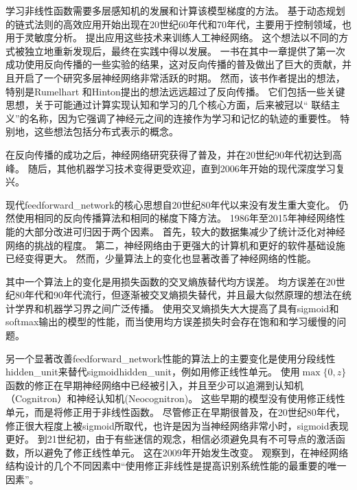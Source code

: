 学习非线性函数需要多层感知机的发展和计算该模型梯度的方法。
基于动态规划的链式法则的高效应用开始出现在20世纪60年代和70年代，主要用于控制领域\citep{Kelley-1960,Bryson-et-al-1961,Dreyfus-1962,Bryson-1969,Dreyfus-1973}，也用于灵敏度分析\citep{Linnainmaa-1976}。 
\cite{Werbos-1981}提出应用这些技术来训练人工神经网络。
这个想法以不同的方式被独立地重新发现后\citep{LeCun85,Parker-1985,Rumelhart86b-small}，最终在实践中得以发展。
一书在其中一章提供了第一次成功使用反向传播的一些实验的结果\citep{Rumelhart86c}，这对反向传播的普及做出了巨大的贡献，并且开启了一个研究多层神经网络非常活跃的时期。
然而，该书作者提出的想法，特别是Rumelhart 和Hinton提出的想法远远超过了反向传播。
它们包括一些关键思想，关于可能通过计算实现认知和学习的几个核心方面，后来被冠以`` 联结主义''的名称，因为它强调了神经元之间的连接作为学习和记忆的轨迹的重要性。
特别地，这些想法包括分布式表示的概念\citep{Hinton-et-al-PDP1986}。

在反向传播的成功之后，神经网络研究获得了普及，并在20世纪90年代初达到高峰。 
随后，其他机器学习技术变得更受欢迎，直到2006年开始的现代深度学习复兴。

现代\gls{feedforward_network}的核心思想自20世纪80年代以来没有发生重大变化。
仍然使用相同的反向传播算法和相同的梯度下降方法。
1986年至2015年神经网络性能的大部分改进可归因于两个因素。
首先，较大的数据集减少了统计泛化对神经网络的挑战的程度。
第二，神经网络由于更强大的计算机和更好的软件基础设施已经变得更大。
然而，少量算法上的变化也显著改善了神经网络的性能。
  
  
其中一个算法上的变化是用损失函数的交叉熵族替代均方误差。
均方误差在20世纪80年代和90年代流行，但逐渐被交叉熵损失替代，并且最大似然原理的想法在统计学界和机器学习界之间广泛传播。
使用交叉熵损失大大提高了具有sigmoid和softmax输出的模型的性能，而当使用均方误差损失时会存在饱和和学习缓慢的问题。

另一个显著改善\gls{feedforward_network}性能的算法上的主要变化是使用分段线性\gls{hidden_unit}来替代sigmoid\gls{hidden_unit}，例如用修正线性单元。
使用$\max\{0, z\}$函数的修正在早期神经网络中已经被引入，并且至少可以追溯到认知机（Cognitron）和神经认知机(Neocognitron)\citep{Fukushima75,Fukushima80}。
这些早期的模型没有使用修正线性单元，而是将修正用于非线性函数。
尽管修正在早期很普及，在20世纪80年代，修正很大程度上被sigmoid所取代，也许是因为当神经网络非常小时，sigmoid表现更好。
到21世纪初，由于有些迷信的观念，相信必须避免具有不可导点的激活函数，所以避免了修正线性单元。
这在2009年开始发生改变。
\cite{Jarrett-ICCV2009-small}观察到，在神经网络结构设计的几个不同因素中``使用修正非线性是提高识别系统性能的最重要的唯一因素''。


